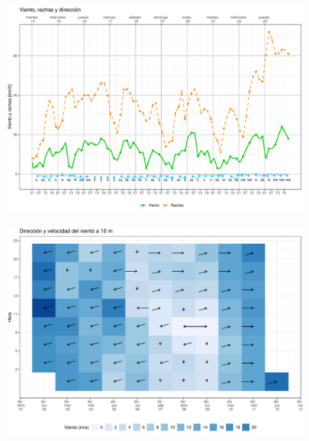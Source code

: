 \documentclass[[a4paper,landscape]{article}\usepackage[]{graphicx}\usepackage[]{color}
\makeatletter
\def\maxwidth{ %
  \ifdim\Gin@nat@width>\linewidth
    \linewidth
  \else
    \Gin@nat@width
  \fi
}
\newenvironment{knitrout}{}{} %
\makeatother
\begin{document}
\begin{figure}
\begin{knitrout}
\color{fgcolor}
\includegraphics[width=\maxwidth]{figure/Figdir2-1} 

\end{knitrout}
\end{figure}


\begin{figure}
\begin{knitrout}
\color{fgcolor}
\includegraphics[width=\maxwidth]{figure/Figdir3-1} 

\end{knitrout}
\end{figure}
\end{document}

